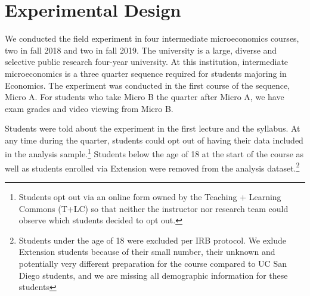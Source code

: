 \documentclass[12pt]{article}
\begin{document}

\section{Experimental Design} \label{expdesign}
We conducted the field experiment in four intermediate microeconomics courses, two in fall 2018 and two in fall 2019. The university is a large, diverse and selective public research four-year university. At this institution, intermediate microeconomics is a three quarter sequence required for students majoring in Economics. The experiment was conducted in the first course of the sequence, Micro A. For students who take Micro B the quarter after Micro A, we have exam grades and video viewing from Micro B.

Students were told about the experiment in the first lecture and the syllabus. At any time during the quarter, students could opt out of having their data included in the analysis sample.\footnote{Students opt out via an online form owned by the Teaching + Learning Commons (T+LC) so that neither the instructor nor research team could observe which students decided to opt out.} Students below the age of 18 at the start of the course as well as students enrolled via Extension were removed from the analysis dataset.\footnote{Students under the age of 18 were excluded per IRB protocol. We exlude Extension students because of their small number, their unknown and potentially very different preparation for the course compared to UC San Diego students, and we are missing all demographic information for these students}
\end{document}
